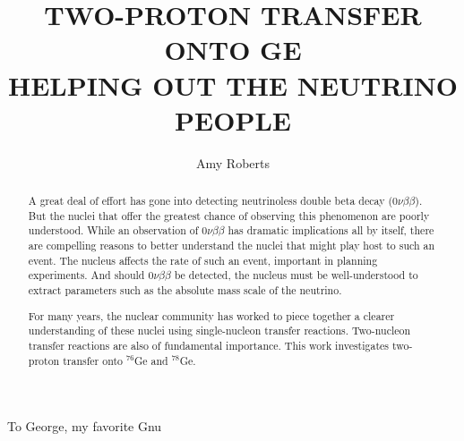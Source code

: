 \documentclass[textrefs,final,noinfo,12pt]{nddiss2e}
\newcommand{\Ge}[1]{$^{#1}$Ge\xspace}
\newcommand{\zvbb}{$0\nu\beta\beta$\xspace}
\begin{document}
\frontmatter

\title{TWO-PROTON TRANSFER ONTO GE \\ {\small\scshape HELPING OUT THE NEUTRINO PEOPLE} }
\author{Amy Roberts}

\maketitle
%
%

\makecopyright

\begin{abstract}
A great deal of effort has gone into detecting neutrinoless double beta decay (\zvbb).  But the nuclei that offer the greatest chance of observing this phenomenon are poorly understood.  While an observation of \zvbb has dramatic implications all by itself, there are compelling reasons to better understand the nuclei that might play host to such an event.  The nucleus affects the rate of such an event, important in planning experiments.  And should \zvbb be detected, the nucleus must be well-understood to extract parameters such as the absolute mass scale of the neutrino.

For many years, the nuclear community has worked to piece together a clearer understanding of these nuclei using single-nucleon transfer reactions.  Two-nucleon transfer reactions are also of fundamental importance.  This work investigates two-proton transfer onto \Ge{76} and \Ge{78}.
\end{abstract}

\renewcommand{\dedicationname}{New Dedication Name}

\begin{dedication}
  To George, my favorite Gnu
\end{dedication}

\tableofcontents
\listoffigures
\listoftables
\end{document}

